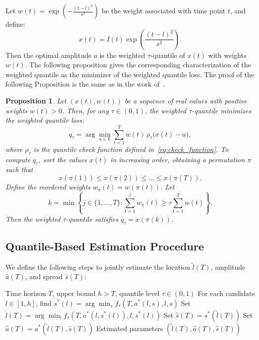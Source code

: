 \documentclass[12pt,a4paper]{article}
\newtheorem{proposition}{Proposition}
\begin{document}
Let \( w(t) = \exp\left( -\frac{(t - l)^2}{s^2} \right) \) be the weight associated with time point \( t \), and define:
\[
x(t) = I(t) \exp\left( \frac{(t - l)^2}{s^2} \right).
\]
Then the optimal amplitude $a$ is the weighted $\tau$-quantile of
$x(t)$ with weights $w(t)$. The following proposition gives the
corresponding characterization of the weighted quantile as the minimizer
of the weighted quantile loss.
The proof of the following Proposition is the same as in the work of~\citet{Nov20}.
\begin{proposition}
\label{prop:weighted:quantile}
Let \( (x(t), w(t)) \) be a sequence of real values with positive weights \( w(t) > 0 \). Then, for any \( \tau \in (0,1) \), the weighted \( \tau \)-quantile minimizes the weighted quantile loss:
\[
q_\tau = \arg\min_{a \in \mathbb{R}} \sum_{t=1}^T w(t)\,\rho_\tau\bigl(x(t) - a\bigr),
\]
where $\rho_\tau$ is the quantile check function defined in~\eqref{eq:check_function}.
To compute \( q_\tau \), sort the values \( x(t) \) in increasing order, obtaining a permutation \( \pi \) such that
\[
x(\pi(1)) \leq x(\pi(2)) \leq \dots \leq x(\pi(T)).
\]
Define the reordered weights \( w_\pi(t) = w(\pi(t)) \). Let
\[
k = \min \left\{ j \in \{1, \dots, T\} : \sum_{t=1}^j w_\pi(t) \geq \tau \sum_{t=1}^T w(t) \right\}.
\]
Then the weighted \( \tau \)-quantile satisfies \( q_\tau = x(\pi(k)) \).
\end{proposition}


\subsection{Quantile-Based Estimation Procedure}

We define the following steps to jointly estimate the location \( \hat{l}(T) \), amplitude \( \hat{a}(T) \), and spread \( \hat{s}(T) \):

\begin{algorithm}[htbp]
\caption{Quantile-based estimation of peak parameters}
\label{algo:quantile}
\begin{algorithmic}[1]
\REQUIRE Time horizon \( T \), upper bound \( h > T \), quantile level \( \tau \in (0,1) \)
\STATE For each candidate \( l \in [1, h] \), find \( s^*(l) = \arg\min_s f_\tau(T, a^*(l,s), l, s) \)
\STATE Set \( \hat{l}(T) = \arg\min_l f_\tau(T, a^*(l,s^*(l)), l, s^*(l)) \)
\STATE Set \( \hat{s}(T) = s^*(\hat{l}(T)) \)
\STATE Set \( \hat{a}(T) = a^*(\hat{l}(T), \hat{s}(T)) \)
\ENSURE Estimated parameters \( (\hat{l}(T), \hat{a}(T), \hat{s}(T)) \)
\end{algorithmic}
\end{algorithm}
\end{document}

